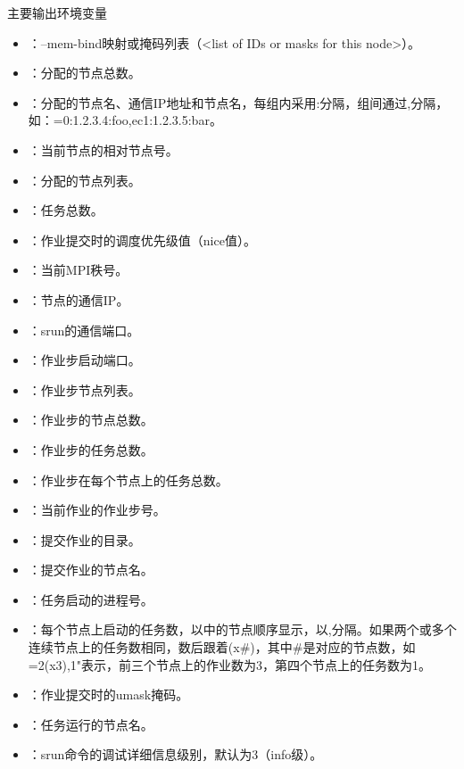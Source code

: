 \begin{frame}{主要输出环境变量}
\begin{itemize}
	\item {}：--mem-bind映射或掩码列表（<list of IDs or masks for this node>）。
	\item {}：分配的节点总数。
	\item {}：分配的节点名、通信IP地址和节点名，每组内采用:分隔，组间通过,分隔，如：=0:1.2.3.4:foo,ec1:1.2.3.5:bar。
	\item {}：当前节点的相对节点号。
	\item {}：分配的节点列表。
	\item {}：任务总数。
	\item {}：作业提交时的调度优先级值（nice值）。
	\item {}：当前MPI秩号。
	\item {}：节点的通信IP。
	\item {}：srun的通信端口。
	\item {}：作业步启动端口。
	\item {}：作业步节点列表。
	\item {}：作业步的节点总数。
	\item {}：作业步的任务总数。
	\item {}：作业步在每个节点上的任务总数。
	\item {}：当前作业的作业步号。
	\item {}：提交作业的目录。
	\item {}：提交作业的节点名。
	\item {}：任务启动的进程号。
	\item {}：每个节点上启动的任务数，以中的节点顺序显示，以,分隔。如果两个或多个连续节点上的任务数相同，数后跟着(x\#)，其中\#是对应的节点数，如=2(x3),1"表示，前三个节点上的作业数为3，第四个节点上的任务数为1。
	\item {}：作业提交时的umask掩码。
	\item {}：任务运行的节点名。
	\item {}：srun命令的调试详细信息级别，默认为3（info级）。
\end{itemize}
\end{frame}

